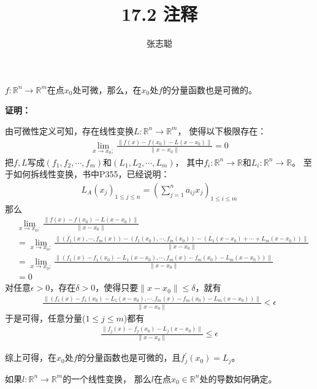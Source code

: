 \documentclass{article}
\begin{document}
\title{17.2 注释}
\author{张志聪}
\maketitle

\begin{zremark}
  $f: \mathbb{R}^n \to \mathbb{R}^m$在点$x_0$处可微，那么，在$x_0$处$f$的分量函数也是可微的。
\end{zremark}

\textbf{证明：}

由可微性定义可知，存在线性变换$L: \mathbb{R}^n \to \mathbb{R}^m$，
使得以下极限存在：
\begin{align*}
  \lim\limits_{x \to x_0;} \frac{\|f(x) - f(x_0) - L(x - x_0)\|}{\|x - x_0\|} = 0
\end{align*}
把$f,L$写成$(f_1, f_2, \cdots, f_m)$和$(L_1, L_2, \cdots, L_m)$，
其中$f_i: \mathbb{R}^n \to \mathbb{R}$和$L_i: \mathbb{R}^n \to \mathbb{R}$。
至于如何拆线性变换，书中P355，已经说明：
\begin{align*}
  L_A(x_j)_{1 \leq j \leq n} = \left(\sum \limits_{j = 1}^n a_{ij}x_j\right)_{1 \leq i \leq m}
\end{align*}
那么
\begin{align*}
   & \lim\limits_{x \to x_0;} \frac{\|f(x) - f(x_0) - L(x - x_0)\|}{\|x - x_0\|}                                                                        \\
   & = \lim\limits_{x \to x_0;} \frac{\|(f_1(x), \cdots ,f_m(x)) - (f_1(x_0), \cdots ,f_m(x_0)) - (L_1(x - x_0)+ \cdots + L_m(x - x_0))\|}{\|x - x_0\|} \\
   & = \lim\limits_{x \to x_0;} \frac{\|(f_1(x) - f_1(x_0) - L_1(x - x_0), \cdots , f_m(x) - f_m(x_0) - L_m(x - x_0))\|}{\|x - x_0\|}                   \\
   & = 0
\end{align*}
对任意$\epsilon > 0$，存在$\delta > 0$，使得只要$\|x - x_0\| \leq \delta$，就有
\begin{align*}
  \frac{\|(f_1(x) - f_1(x_0) - L_1(x - x_0), \cdots , f_m(x) - f_m(x_0) - L_m(x - x_0))\|}{\|x - x_0\|} < \epsilon
\end{align*}
于是可得，任意分量($1 \leq j \leq m$)都有
\begin{align*}
  \frac{\|f_j(x) - f_j(x_0) - L_j(x - x_0)\|}{\|x - x_0\|} \leq \epsilon
\end{align*}

综上可得，在$x_0$处$f$的分量函数也是可微的，且$f_j^\prime(x_0) = L_j$。


\begin{zremark}
  如果$l: \mathbb{R}^n \to \mathbb{R}^m$的一个线性变换，
  那么$l$在点$x_0 \in \mathbb{R}^n$处的导数如何确定。
\end{zremark}
\end{document}
